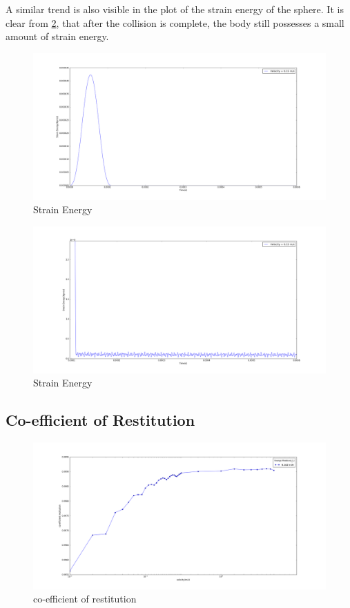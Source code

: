 A similar trend is also visible in the plot of the strain energy of the sphere. It is clear from \ref{fig:SEzoomed}, that after the collision is complete, the body still possesses a small amount of strain energy.

\begin{figure}[H]
\includegraphics[width=1.0\textwidth]{../images/StrainEnergy/strainenergy.png}
\caption{Strain Energy}
\label{fig:SE}
\end{figure}
\begin{figure}[H]
\includegraphics[width=1.0\textwidth]{../images/StrainEnergy/strainenergy-zoomed.png}
\caption{Strain Energy}
\label{fig:SEzoomed}
\end{figure}


\subsection{Co-efficient of Restitution}

\begin{figure}[H]
\includegraphics[width=1.0\textwidth]{../images/COR/COR.png}
\caption{co-efficient of restitution}
\label{fig:COR}
\end{figure}

